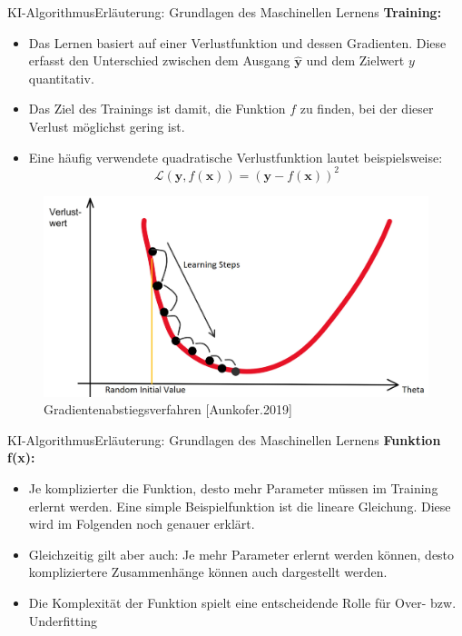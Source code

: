\documentclass[169, handout	]{THIbeamer} %
\begin{document}
	\begin{frame}{KI-Algorithmus}{Erläuterung: Grundlagen des Maschinellen Lernens}
		\footnotesize
		\textbf{Training: } 		
		\scriptsize	
		\begin{itemize}
			\item Das Lernen basiert auf einer Verlustfunktion und dessen Gradienten. Diese erfasst den Unterschied zwischen dem Ausgang $\hat{\textbf{y}}$ und dem Zielwert $y$ quantitativ.
			\item Das Ziel des Trainings ist damit, die Funktion $f$ zu finden, bei der dieser Verlust möglichst gering ist. 
			\item Eine häufig verwendete quadratische Verlustfunktion lautet beispielsweise:
			\begin{equation}
				\mathcal{L}(\textbf{y}, f(\textbf{x})) = (\textbf{y} - f(\textbf{x}))^{2}
			\end{equation}
		\end{itemize}	
		\begin{figure}
			\includegraphics[scale=0.2]{required/Loss_function.jpg}
			\caption{\scriptsize Gradientenabstiegsverfahren [Aunkofer.2019]}
        	\label{Machine Learning}
		\end{figure}			
	\end{frame}
	\begin{frame}{KI-Algorithmus}{Erläuterung: Grundlagen des Maschinellen Lernens}
		\small		
		\textbf{Funktion f(x):}
		\begin{itemize}
			\item Je komplizierter die Funktion, desto mehr Parameter müssen im Training erlernt werden. Eine simple Beispielfunktion ist die lineare Gleichung. Diese wird im Folgenden noch genauer erklärt.
			\item Gleichzeitig gilt aber auch: Je mehr Parameter erlernt werden können, desto kompliziertere Zusammenhänge können auch dargestellt werden. 
			\item Die Komplexität der Funktion spielt eine entscheidende Rolle für Over- bzw. Underfitting
		\end{itemize}
	\end{frame}
\end{document}
